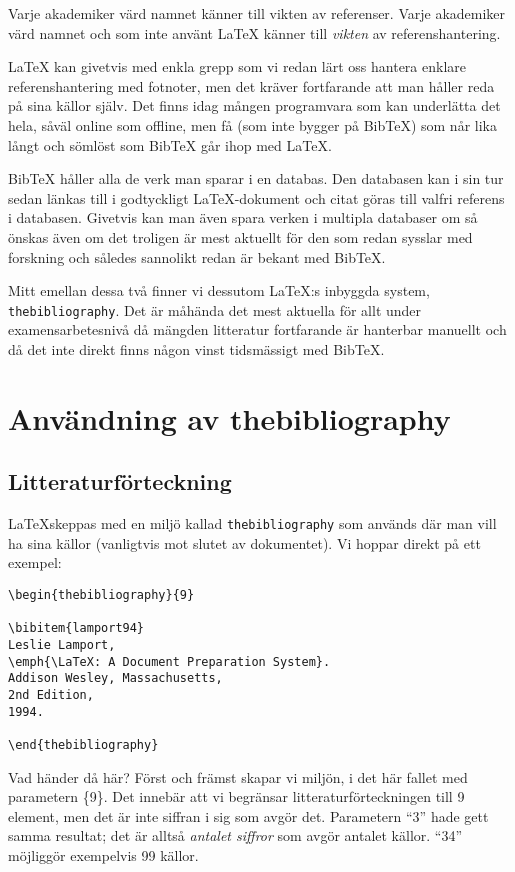 Varje akademiker värd namnet känner till vikten av referenser. Varje akademiker värd namnet och som inte använt \LaTeX{} känner till \emph{vikten} av referenshantering.

\LaTeX{} kan givetvis med enkla grepp som vi redan lärt oss hantera enklare referenshantering med fotnoter, men det kräver fortfarande att man håller reda på sina källor själv. Det finns idag mången programvara som kan underlätta det hela, såväl online som offline, men få (som inte bygger på BibTeX) som når lika långt och sömlöst som BibTeX går ihop med \LaTeX.

BibTeX håller alla de verk man sparar i en databas. Den databasen kan i sin tur sedan länkas till i godtyckligt \LaTeX-dokument och citat göras till valfri referens i databasen. Givetvis kan man även spara verken i multipla databaser om så önskas även om det troligen är mest aktuellt för den som redan sysslar med forskning och således sannolikt redan är bekant med BibTeX.

Mitt emellan dessa två finner vi dessutom \LaTeX:s inbyggda system, \verb?thebibliography?. Det är måhända det mest aktuella för allt under examensarbetesnivå då mängden litteratur fortfarande är hanterbar manuellt och då det inte direkt finns någon vinst tidsmässigt med BibTeX.

\section{Användning av thebibliography}
\subsection{Litteraturförteckning}
\LaTeX skeppas med en miljö kallad \verb?thebibliography? som används där man vill ha sina källor (vanligtvis mot slutet av dokumentet). Vi hoppar direkt på ett exempel:

\begin{verbatim}
\begin{thebibliography}{9}

\bibitem{lamport94}
Leslie Lamport,
\emph{\LaTeX: A Document Preparation System}.
Addison Wesley, Massachusetts,
2nd Edition,
1994.

\end{thebibliography}
\end{verbatim}

Vad händer då här? Först och främst skapar vi miljön, i det här fallet med parametern \{9\}. Det innebär att vi begränsar litteraturförteckningen till 9 element, men det är inte siffran i sig som avgör det. Parametern ``3'' hade gett samma resultat; det är alltså \emph{antalet siffror} som avgör antalet källor. ``34'' möjliggör exempelvis 99 källor.

